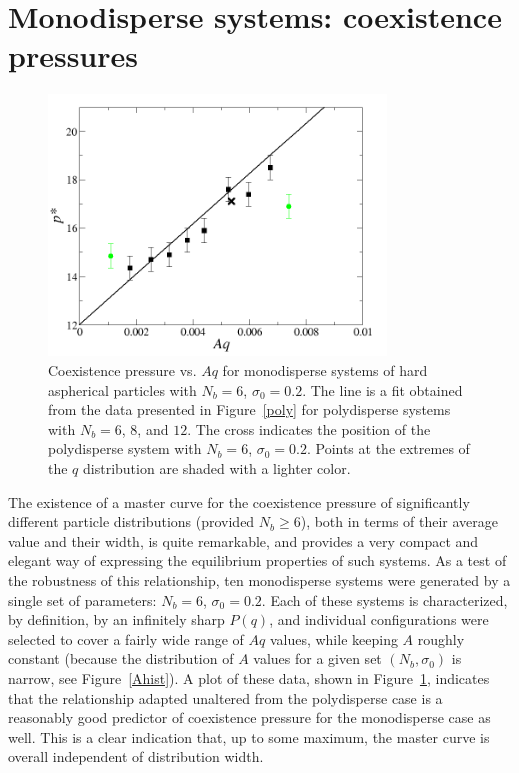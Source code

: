 \section{Monodisperse systems: coexistence pressures}\label{sec:disorderpress}
\begin{figure}
	\begin{center}\includegraphics[width=0.8\textwidth]{polydisperse/mono2.png}\end{center}
	\caption[Coexistence pressure vs. $Aq$ for monodisperse systems of aspherical particles]{Coexistence pressure vs. $Aq$ for monodisperse systems of hard aspherical particles with $N_b = 6$, $\sigma_0 = 0.2$.  The line is a fit obtained from the data presented in Figure~\ref{poly} for polydisperse systems with $N_b = 6$, $8$, and $12$.  The cross indicates the position of the polydisperse system with $N_b = 6$, $\sigma_0 = 0.2$.
Points at the extremes of the $q$ distribution are shaded with a lighter color.}\label{mono2}
\end{figure}

The existence of a master curve for the coexistence pressure of significantly different particle distributions (provided $N_b\geq6$), both in terms of their average value  and their width, is quite remarkable, and provides a very compact and elegant way of expressing the equilibrium properties of such systems.  
As a test of the robustness of this relationship, ten monodisperse systems were generated by a single set of parameters: $N_b = 6$, $\sigma_0 = 0.2$.
Each of these systems is characterized, by definition, by an infinitely sharp $P(q)$, and individual configurations were selected to cover a fairly wide range of $Aq$ values, while keeping $A$ roughly constant (because the distribution of $A$ values for a given set $(N_b,\sigma_0)$ is narrow, see Figure~\ref{Ahist}). 
A plot of these data, shown in Figure~\ref{mono2}, indicates that the relationship adapted unaltered from the polydisperse case is a reasonably good predictor of coexistence pressure for the monodisperse case as well.
This is a clear indication that, up to some maximum, the master curve is overall independent of distribution width.

